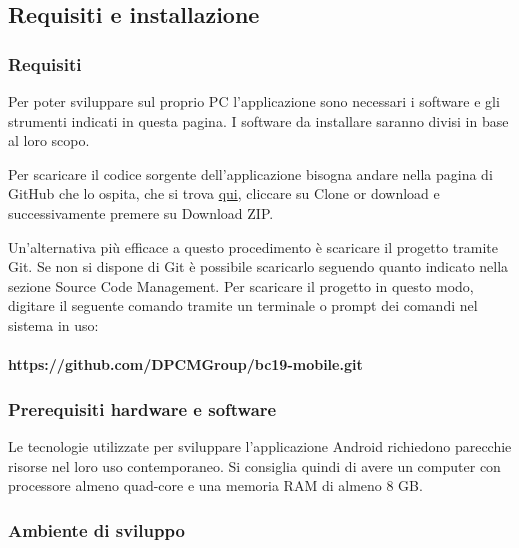 \subsection{Requisiti e installazione}

\subsubsection{Requisiti}
Per poter sviluppare sul proprio PC l'applicazione sono necessari i software e gli strumenti indicati in questa pagina. I software da installare saranno divisi in base al loro scopo.

Per scaricare il codice sorgente dell'applicazione bisogna andare nella pagina di GitHub che lo ospita, che si trova \href{https://github.com/DPCMGroup/bc19-mobile}{qui}, cliccare su Clone or download e successivamente premere su Download ZIP.

Un'alternativa più efficace a questo procedimento è scaricare il progetto tramite Git. Se non si dispone di Git è possibile scaricarlo seguendo quanto indicato nella sezione Source Code Management. Per scaricare il progetto in questo modo, digitare il seguente comando tramite un terminale o prompt dei comandi nel sistema in uso:\\ \\
\textbf{https://github.com/DPCMGroup/bc19-mobile.git}

\subsubsection{Prerequisiti hardware e software}
Le tecnologie utilizzate per sviluppare l'applicazione Android richiedono parecchie risorse nel loro uso contemporaneo. Si consiglia quindi di avere un computer con processore almeno quad-core e una memoria RAM di almeno 8 GB.

\subsubsection{Ambiente di sviluppo}

